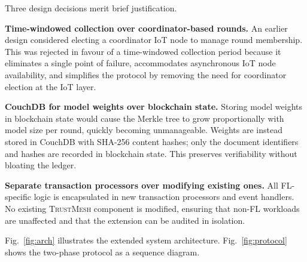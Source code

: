 \documentclass[lettersize,journal]{IEEEtran}
\newcommand{\tm}{\textsc{TrustMesh}}
\begin{document}
Three design decisions merit brief justification.

\textbf{Time-windowed collection over coordinator-based rounds.} An earlier design
considered electing a coordinator IoT node to manage round membership. This was rejected
in favour of a time-windowed collection period because it eliminates a single point of
failure, accommodates asynchronous IoT node availability, and simplifies the protocol
by removing the need for coordinator election at the IoT layer.

\textbf{CouchDB for model weights over blockchain state.} Storing model weights in
blockchain state would cause the Merkle tree to grow proportionally with model size per
round, quickly becoming unmanageable. Weights are instead stored in CouchDB with SHA-256
content hashes; only the document identifiers and hashes are recorded in blockchain state.
This preserves verifiability without bloating the ledger.

\textbf{Separate transaction processors over modifying existing ones.} All FL-specific
logic is encapsulated in new transaction processors and event handlers. No existing
\tm{} component is modified, ensuring that non-FL workloads are unaffected and that the
extension can be audited in isolation.

Fig.~\ref{fig:arch} illustrates the extended system architecture.
Fig.~\ref{fig:protocol} shows the two-phase protocol as a sequence diagram.
\end{document}
